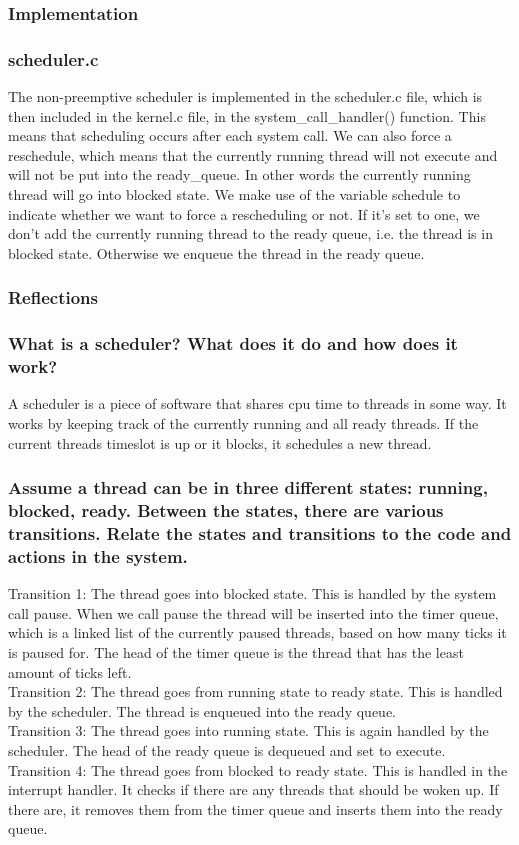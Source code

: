\subsubsection{Implementation}
\subsubsection*{scheduler.c}
The non-preemptive scheduler is implemented in the scheduler.c file, which is then included in the kernel.c file, in the system\_{}call\_{}handler() function. This means that scheduling occurs after each system call. We can also force a reschedule, which means that the currently running thread will not execute and will not be put into the ready\_{}queue. In other words the currently running thread will go into blocked state.
We make use of the variable schedule to indicate whether we want to force a rescheduling or not. If it's set to one, we don't add the currently running thread to the ready queue, i.e. the thread is in blocked state. Otherwise we enqueue the thread in the ready queue.




\subsubsection{Reflections}

\subsubsection*{What is a scheduler? What does it do and how does it work?}
A scheduler is a piece of software that shares cpu time to threads in some way. It works by keeping track of the currently running and all ready threads. If the current threads timeslot is up or it blocks, it schedules a new thread.
\subsubsection*{Assume a thread can be in three different states: running, blocked, ready. Between the states, there are various transitions. Relate the states and transitions to the code and actions in the system.}
Transition 1: The thread goes into blocked state. This is handled by the system call pause. When we call pause the thread will be inserted into the timer queue, which is a linked list of the currently paused threads, based on how many ticks it is paused for.  The head of the timer queue is the thread that has the least amount of ticks left.\\
Transition 2: The thread goes from running state to ready state. This is handled by the scheduler. The thread is enqueued into the ready queue.\\
Transition 3: The thread goes into running state. This is again handled by the scheduler. The head of the ready queue is dequeued and set to execute.\\
Transition 4: The thread goes from blocked to ready state. This is handled in the interrupt handler. It checks if there are any threads that should be woken up. If there are, it removes them from the timer queue and inserts them into the ready queue.

